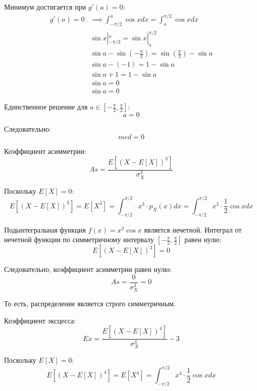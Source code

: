 \documentclass[a4paper,14pt]{extarticle}
\begin{document}
            Минимум достигается при $g'(a) = 0$:
            \begin{align*}
                g'(a) = 0 &\implies \int_{-\pi/2}^{a} \cos x dx = \int_{a}^{\pi/2} \cos x dx \\
                & \sin x|_{-\pi/2}^{a} = \sin x|_{a}^{\pi/2} \\
                & \sin a - \sin\left(-\frac{\pi}{2}\right) = \sin\left(\frac{\pi}{2}\right) - \sin a \\
                & \sin a - (-1) = 1 - \sin a \\
                & \sin a + 1 = 1 - \sin a \\
                &   \sin a = 0 \\
                & \sin a = 0
            \end{align*}
            
            Единственное решение для $a \in \left[-\frac{\pi}{2}, \frac{\pi}{2}\right]$:
            $$
            a = 0
            $$
            
            Следовательно:
            $$
            \boxed{med = 0}
            $$
            
            Коэффициент асимметрии:
            $$
            As = \frac{E[(X - E[X])^3]}{\sigma_X^3}
            $$
            
            Поскольку $E[X] = 0$:
            $$
            E[(X - E[X])^3] = E[X^3] = \int_{-\pi/2}^{\pi/2} x^3 \cdot p_X(x) dx = \int_{-\pi/2}^{\pi/2} x^3 \cdot \frac{1}{2} \cos x dx
            $$
            
            Подынтегральная функция $f(x) = x^3 \cos x$ является нечетной.
            Интеграл от нечетной функции по симметричному интервалу $\left[-\frac{\pi}{2}, \frac{\pi}{2}\right]$ равен нулю:
            $$
            E[(X - E[X])^3] = 0
            $$
            
            Следовательно, коэффициент асимметрии равен нулю:
            $$
            \boxed{As = \frac{0}{\sigma_X^3} = 0}
            $$
            
            То есть, распределение является строго симметричным.
            
            Коэффициент эксцесса:
            $$
            Ex = \frac{E[(X - E[X])^4]}{\sigma_X^4} - 3
            $$
            
            Поскольку $E[X] = 0$:
            $$
            E[(X - E[X])^4] = E[X^4] = \int_{-\pi/2}^{\pi/2} x^4 \cdot \frac{1}{2} \cos x dx
            $$
            
\end{document}

